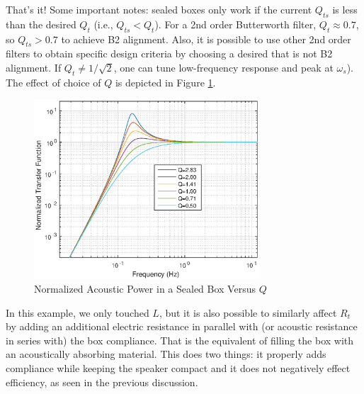 \documentclass[10pt]{book}
\begin{document}
That's it! Some important notes: sealed boxes only work if the current $Q_{ts}$ is less than the desired $Q_t$ (i.e., $Q_{ts}<Q_{t}$). For a 2nd order Butterworth filter, $Q_t\approx 0.7$, so $Q_{ts}>0.7$ to achieve B2 alignment. Also, it is possible to use other 2nd order filters to obtain specific design criteria by choosing a desired that is not B2 alignment. If $Q_{t}\neq 1/\sqrt{2}$, one can tune  low-frequency response and peak at $\omega_s$). The effect of choice of $Q$ is depicted in Figure \ref{fig:sealedBoxQ}.

\begin{figure}
\centering
\includegraphics[width=0.75\textwidth]{matlab/sealedBoxQ.eps}
\caption{Normalized Acoustic Power in a Sealed Box Versus $Q$}\label{fig:sealedBoxQ}
\end{figure}

In this example, we only touched $L$, but it is also possible to similarly affect $R_t$ by adding an additional electric resistance in parallel with (or acoustic resistance in series with) the box compliance. That is the equivalent of filling the box with an acoustically absorbing material. This does two things: it properly adds compliance while keeping the speaker compact and it does not negatively effect efficiency, as seen in the previous discussion.
\end{document}
